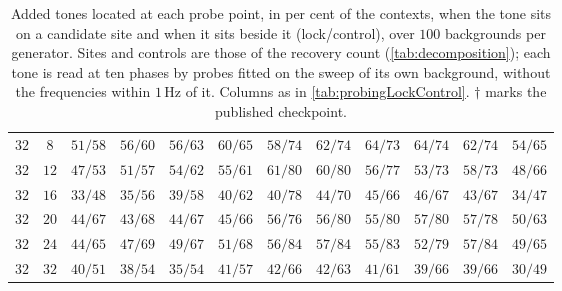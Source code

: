 \begin{table}[!tbp]
\begin{tabular}{@{}cccccccccccc@{}}
        \addlinespace[2pt]
        $32$ & $8$ & $51/58$ & $56/60$ & $56/63$ & $60/65$ & $58/74$ & $62/74$ & $64/73$ & $64/74$ & $62/74$ & $54/65$ \\
        $32$ & $12$ & $47/53$ & $51/57$ & $54/62$ & $55/61$ & $61/80$ & $60/80$ & $56/77$ & $53/73$ & $58/73$ & $48/66$ \\
        $32$ & $16$ & $33/48$ & $35/56$ & $39/58$ & $40/62$ & $40/78$ & $44/70$ & $45/66$ & $46/67$ & $43/67$ & $34/47$ \\
        $32$ & $20$ & $44/67$ & $43/68$ & $44/67$ & $45/66$ & $56/76$ & $56/80$ & $55/80$ & $57/80$ & $57/78$ & $50/63$ \\
        $32$ & $24$ & $44/65$ & $47/69$ & $49/67$ & $51/68$ & $56/84$ & $57/84$ & $55/83$ & $52/79$ & $57/84$ & $49/65$ \\
        $32$ & $32$ & $40/51$ & $38/54$ & $35/54$ & $41/57$ & $42/66$ & $42/63$ & $41/61$ & $39/66$ & $39/66$ & $30/49$ \\
        \bottomrule
    \end{tabular}
    \caption{Added tones located at each probe point, in per cent of the contexts, when the tone sits on a candidate site and when it sits beside it (lock/control), over $100$ backgrounds per generator. Sites and controls are those of the recovery count (\autoref{tab:decomposition}); each tone is read at ten phases by probes fitted on the sweep of its own background, without the frequencies within $1$\,Hz of it. Columns as in \autoref{tab:probingLockControl}. $\dagger$ marks the published checkpoint.}
    \label{tab:probingLockControlBg}
\end{table}

